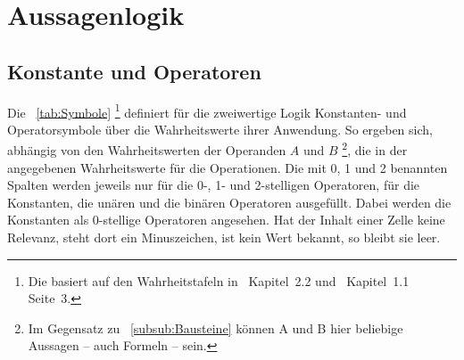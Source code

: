 \section{Aussagenlogik}%
\label{sec:Aussagenlogik}

\subsection{Konstante und Operatoren}%
\label{sub:Operatoren}

Die \tablename~\vref{tab:Symbole}%
\footnote{%
	Die \tablename{} basiert auf den Wahrheitstafeln in~\cite{bib:Junktor} Kapitel~2.2 und~\cite{bib:Rautenberg} Kapitel~1.1 Seite~3.%
}
definiert für die zweiwertige Logik Konstanten- und Operatorsymbole über die Wahrheitswerte ihrer Anwendung.
So ergeben sich, abhängig von den Wahrheitswerten der Operanden $A$ und $B$%
\footnote{%
	Im Gegensatz zu \subsubsectionname~\vref{subsub:Bausteine} können A und B hier beliebige Aussagen -- auch Formeln -- sein.%
},
die in der \tablename{} angegebenen Wahrheitswerte für die Operationen.
Die mit 0, 1 und 2 benannten Spalten werden jeweils nur für die 0-, 1- und 2-stelligen Operatoren, \textdh für die Konstanten, die unären und die binären Operatoren ausgefüllt.
Dabei werden die Konstanten als 0-stellige Operatoren angesehen.
Hat der Inhalt einer Zelle keine Relevanz, steht dort ein Minuszeichen, ist kein Wert bekannt, so bleibt sie leer.

                                        
 \setcounter{pnequiv} {\value{prio}}
  \setcounter{pequiv}  {\value{prio}} 
   \setcounter{pnrep}   {\value{prio}}
    \setcounter{prep}    {\value{prio}}
   \setcounter{pnimp}   {\value{prio}}
    \setcounter{pimp}    {\value{prio}} 
    \setcounter{padd}    {\value{prio}}
    \setcounter{pxor}    {\value{prio}}
    \setcounter{pnor}    {\value{prio}}
     \setcounter{por}     {\value{prio}} 
   \setcounter{pmult}   {\value{prio}}
   \setcounter{pnand}   {\value{prio}}
    \setcounter{pand}    {\value{prio}} 
    \setcounter{pnot}    {\value{prio}}

